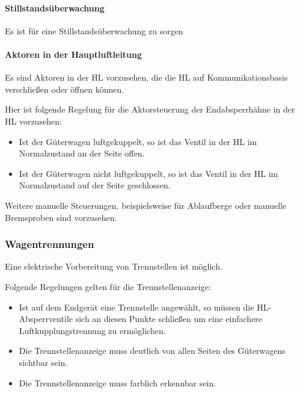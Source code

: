 \paragraph{Stillstandsüberwachung}
\begin{feat}
Es ist für eine Stillstandsüberwachung zu sorgen
\end{feat}

\paragraph{Aktoren in der Hauptluftleitung}
\begin{feat}
Es sind Aktoren in der \acrshort{HL} vorzusehen, die die \acrshort{HL} auf Kommunikationsbasis verschließen oder öffnen können.
\end{feat}
\begin{rem} [zu Anf. 20]
Hier ist folgende Regelung für die Aktorsteuerung der Endabsperrhähne in der \acrshort{HL} vorzusehen:
\begin{itemize}
    \item Ist der Güterwagen luftgekuppelt, so ist das Ventil in der \acrshort{HL} im Normalzustand an der Seite offen.
    \item Ist der Güterwagen nicht luftgekuppelt, so ist das Ventil in der \acrshort{HL} im Normalzustand auf der Seite geschlossen.
\end{itemize}
\end{rem}
\begin{rem} [zu Anf. 20]
Weitere manuelle Steuerungen, beispielsweise für Ablaufberge oder manuelle Bremsproben sind vorzusehen.
\end{rem}

\subsubsection{Wagentrennungen}
\begin{feat}
Eine elektrische Vorbereitung von Trennstellen ist möglich.
\end{feat}
\begin{rem} [zu Anf. 21]
Folgende Regelungen gelten für die Trennstellenanzeige:
\begin{itemize}
    \item Ist auf dem Endgerät eine Trennstelle angewählt, so müssen die \acrshort{HL}-Absperrventile sich an diesen Punkte schließen um eine einfachere Luftkupplungstrennung zu ermöglichen.
    \item Die Trennstellenanzeige muss deutlich von allen Seiten des Güterwagens sichtbar sein.
    \item Die Trennstellenanzeige muss farblich erkennbar sein.
\end{itemize}
\end{rem}

